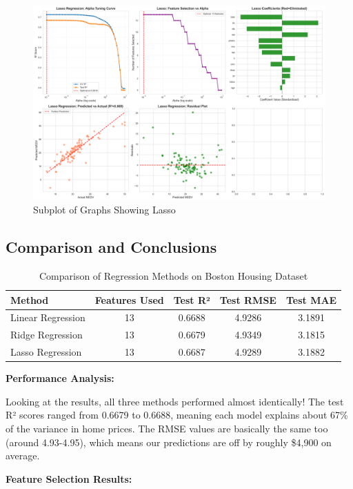 \documentclass[12pt]{article}
\begin{document}
\begin{figure}[H]
    \centering
    \includegraphics[width=0.85\linewidth]{images/04_lasso_regression.png}
    \caption{Subplot of Graphs Showing Lasso}
    \label{fig:lasso}
\end{figure}

\subsection{Comparison and Conclusions}

\begin{table}[H]
\centering
\begin{tabular}{|l|c|c|c|c|}
\hline
\textbf{Method} & \textbf{Features Used} & \textbf{Test R²} & \textbf{Test RMSE} & \textbf{Test MAE} \\
\hline
Linear Regression & 13 & 0.6688 & 4.9286 & 3.1891 \\
Ridge Regression & 13 & 0.6679 & 4.9349 & 3.1815 \\
Lasso Regression & 13 & 0.6687 & 4.9289 & 3.1882 \\
\hline
\end{tabular}
\caption{Comparison of Regression Methods on Boston Housing Dataset}
\label{tab:comparison}
\end{table}

\textbf{Performance Analysis:}

Looking at the results, all three methods performed almost identically! The test R² scores 
ranged from 0.6679 to 0.6688, meaning each model explains about 67\% of the variance in home prices. 
The RMSE values are basically the same too (around 4.93-4.95), which means our predictions 
are off by roughly \$4,900 on average.

\textbf{Feature Selection Results:}
\end{document}
